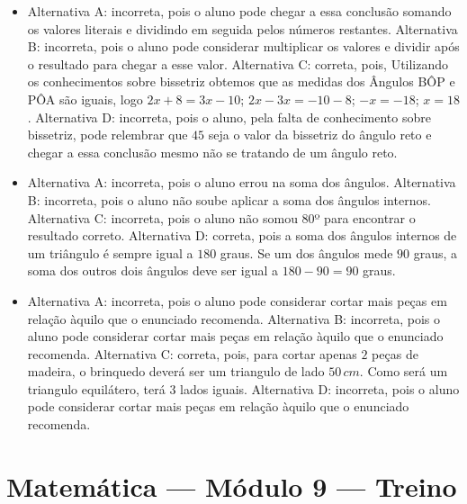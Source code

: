 \begin{itemize}
\item Alternativa A: incorreta, pois o aluno pode chegar a essa conclusão
somando os valores literais e dividindo em seguida pelos números
restantes.
Alternativa B: incorreta, pois o aluno pode considerar multiplicar os
valores e dividir após o resultado para chegar a esse valor.
Alternativa C: correta, pois, Utilizando os conhecimentos sobre
bissetriz obtemos que as medidas dos Ângulos BÔP e PÔA são iguais, logo $2x+8=3x-10$; $2x-3x= -10 - 8$; $-x = -18$; $x = 18$.
Alternativa D: incorreta, pois o aluno, pela falta de conhecimento sobre
bissetriz, pode relembrar que $45$ seja o valor da bissetriz do ângulo
reto e chegar a essa conclusão mesmo não se tratando de um ângulo reto.

\item Alternativa A: incorreta, pois o aluno errou na soma dos ângulos.
Alternativa B: incorreta, pois o aluno não soube aplicar a soma dos
ângulos internos.
Alternativa C: incorreta, pois o aluno não somou $80$º para encontrar o
resultado correto.
Alternativa D: correta, pois a soma dos ângulos internos de um triângulo
é sempre igual a $180$ graus. Se um dos ângulos mede $90$ graus, a soma dos
outros dois ângulos deve ser igual a $180 - 90 = 90$ graus.

\item Alternativa A: incorreta, pois o aluno pode considerar cortar mais peças
em relação àquilo que o enunciado recomenda.
Alternativa B: incorreta, pois o aluno pode considerar cortar mais peças
em relação àquilo que o enunciado recomenda.
Alternativa C: correta, pois, para cortar apenas $2$ peças de madeira, o
brinquedo deverá ser um triangulo de lado $50\,cm$. Como será um triangulo
equilátero, terá $3$ lados iguais.
Alternativa D: incorreta, pois o aluno pode considerar cortar mais peças
em relação àquilo que o enunciado recomenda.
\end{itemize}

\section*{Matemática — Módulo 9 — Treino}

